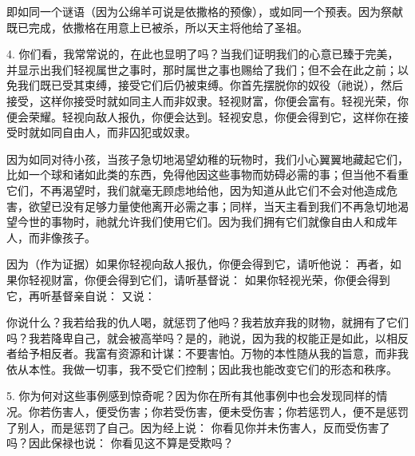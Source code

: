 即如同一个谜语（因为公绵羊可说是依撒格的预像），或如同一个预表。因为祭献既已完成，依撒格在用意上已被杀，所以天主将他给了圣祖。\par

4. 你们看，我常常说的，在此也显明了吗？当我们证明我们的心意已臻于完美，并显示出我们轻视属世之事时，那时属世之事也赐给了我们；但不会在此之前；以免我们既已受其束缚，接受它们后仍被束缚。你首先摆脱你的奴役（祂说），然后接受，这样你接受时就如同主人而非奴隶。轻视财富，你便会富有。轻视光荣，你便会荣耀。轻视向敌人报仇，你便会达到。轻视安息，你便会得到它，这样你在接受时就如同自由人，而非囚犯或奴隶。\par

因为如同对待小孩，当孩子急切地渴望幼稚的玩物时，我们小心翼翼地藏起它们，比如一个球和诸如此类的东西，免得他因这些事物而妨碍必需的事；但当他不看重它们，不再渴望时，我们就毫无顾虑地给他，因为知道从此它们不会对他造成危害，欲望已没有足够力量使他离开必需之事；同样，当天主看到我们不再急切地渴望今世的事物时，祂就允许我们使用它们。因为我们拥有它们就像自由人和成年人，而非像孩子。\par

因为（作为证据）如果你轻视向敌人报仇，你便会得到它，请听他说： 再者，如果你轻视财富，你便会得到它们，请听基督说： 如果你轻视光荣，你便会得到它，再听基督亲自说： 又说：\par

你说什么？我若给我的仇人喝，就惩罚了他吗？我若放弃我的财物，就拥有了它们吗？我若降卑自己，就会被高举吗？是的，祂说，因为我的权能正是如此，以相反者给予相反者。我富有资源和计谋：不要害怕。万物的本性随从我的旨意，而非我依从本性。我做一切事，我不受它们控制；因此我也能改变它们的形态和秩序。\par

5. 你为何对这些事例感到惊奇呢？因为你在所有其他事例中也会发现同样的情况。你若伤害人，便受伤害；你若受伤害，便未受伤害；你若惩罚人，便不是惩罚了别人，而是惩罚了自己。因为经上说： 你看见你并未伤害人，反而受伤害了吗？因此保禄也说： 你看见这不算是受欺吗？\par

